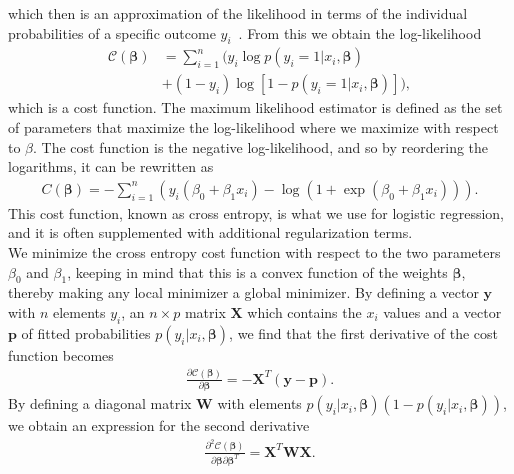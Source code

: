 \documentclass[english,notitlepage,reprint,nofootinbib]{revtex4–2}  %
\begin{document}
which then is an approximation of the likelihood in terms of the individual probabilities of a specific outcome $y_i$~\cite{lecture_notes}. 
From this we obtain the log-likelihood
\begin{align}
    \mathcal{C}(\boldsymbol{\beta}) 
    &= \sum\limits_{i=1}^n (y_i 
    \log p(y_i=1|x_i,\boldsymbol{\beta}) \nonumber \\ 
    &+ (1-y_i) 
    \log[1 - p(y_i=1|x_i,\boldsymbol{\beta})]), 
\end{align}
which is a cost function. 
The maximum likelihood estimator is defined as the set of parameters that maximize the log-likelihood where we maximize with respect to $\beta$. The cost function is the negative log-likelihood, and so by reordering the logarithms, it can be rewritten as 
\begin{align}\label{eq: cost function logistic regression}
    C(\boldsymbol{\beta}) = -\sum\limits_{i=1}^n (y_i(\beta_0 + \beta_1 x_i) - \log(1+\exp(\beta_0 + \beta_1 x_i))).
\end{align}
This cost function, known as cross entropy, is what we use for logistic regression, and it is often supplemented with additional regularization terms. 
\vspace{3mm}
\\ 
We minimize the cross entropy cost function with respect to the two parameters $\beta_0$ and $\beta_1$, keeping in mind that this is a convex function of the weights $\boldsymbol{\beta}$, thereby making any local minimizer a global minimizer. By defining a vector $\boldsymbol{y}$ with $n$ elements $y_i$, an $n\times p$ matrix $\mathbf{X}$ which contains the $x_i$ values and a vector $\boldsymbol{p}$ of fitted probabilities $p(y_i | x_i, \boldsymbol{\beta})$, we find that the first derivative of the cost function becomes 
\begin{align}
    \frac{\partial \mathcal{C}(\boldsymbol{\beta})}{\partial \boldsymbol{\beta}} = -\boldsymbol{X}^T\left(\boldsymbol{y}-\boldsymbol{p}\right).
\end{align}
By defining a diagonal matrix $\mathbf{W}$ with elements $p(y_i | x_i, \boldsymbol{\beta})(1 - p(y_i | x_i, \boldsymbol{\beta}))$, we obtain an expression for the second derivative 
\begin{align}
    \frac{\partial^2 \mathcal{C}(\boldsymbol{\beta})}{\partial \boldsymbol{\beta}\partial \boldsymbol{\beta}^T} = \boldsymbol{X}^T\boldsymbol{W}\boldsymbol{X}.
\end{align}
\vspace{3mm}
\\ 
\end{document}
